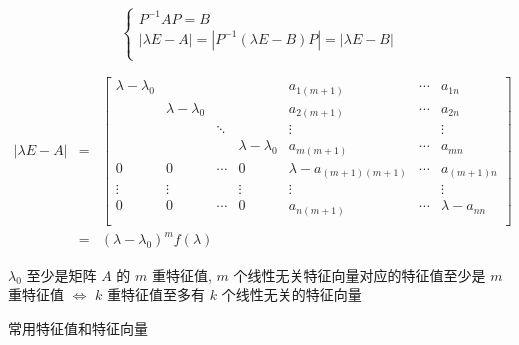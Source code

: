 \begin{theorem}[特征值和特征向量]
	$$\begin{cases}
		P^{-1}AP = B\\
		|\lambda E - A| = |P^{-1}(\lambda E -B)P| = |\lambda E - B|\\
	\end{cases}$$

	\begin{eqnarray*}
		|\lambda E - A| & = & 
		\begin{bmatrix}
			\lambda - \lambda_{0}   &                       &        &                       &  a_{1(m+1)}              & \cdots & a_{1n} \\
									& \lambda - \lambda_{0} &        &                       &  a_{2(m+1)}              & \cdots & a_{2n} \\
									&                       & \ddots &                       &  \vdots                  &        & \vdots \\
									&                       &        & \lambda - \lambda_{0} &  a_{m(m+1)}              & \cdots & a_{mn} \\
			0                       & 0                     & \cdots & 0                     & \lambda - a_{(m+1)(m+1)} & \cdots & a_{(m+1)n}\\
			\vdots                  & \vdots                &        & \vdots                &  \vdots                  &        & \vdots \\
			0                       & 0                     & \cdots & 0                     &  a_{n(m+1)}              & \cdots & \lambda - a_{nn}\\
		\end{bmatrix}\\
						& = & (\lambda - \lambda_{0})^{m}f(\lambda)
	\end{eqnarray*}

	$\lambda_{0}$ 至少是矩阵 $A$ 的 $m$ 重特征值, $m$ 个线性无关特征向量对应的特征值至少是 $m$ 重特征值 $\Leftrightarrow$ $k$ 重特征值至多有 $k$ 个线性无关的特征向量
\end{theorem}

\begin{table}[h]
	\centering
	\caption{常用特征值和特征向量}
	\label{table: 常用特征值和特征向量}
\end{table}

